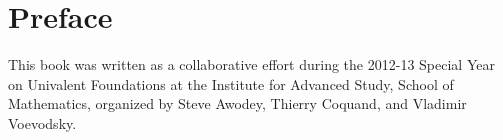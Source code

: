 \chapter*{Preface}
\label{cha:preface}


{%


%

This book was written as a collaborative effort during the 2012-13 Special Year on Univalent Foundations at the Institute for Advanced Study, School of Mathematics, organized by Steve Awodey, Thierry Coquand, and Vladimir Voevodsky.

}
